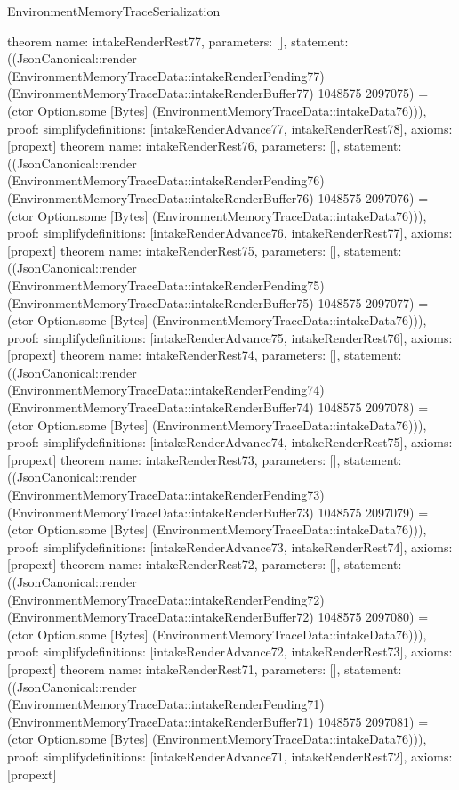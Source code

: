 \begin{lexlean}{EnvironmentMemoryTraceSerialization}
\begin{semanticmodule}
{}
theorem{
 name: intakeRenderRest77, parameters: [],
 statement: ((JsonCanonical::render (EnvironmentMemoryTraceData::intakeRenderPending77) (EnvironmentMemoryTraceData::intakeRenderBuffer77) 1048575 2097075) = (ctor Option.some [Bytes] (EnvironmentMemoryTraceData::intakeData76))), proof: simplify{definitions: [intakeRenderAdvance77, intakeRenderRest78]}, axioms: [propext]
}
theorem{
 name: intakeRenderRest76, parameters: [],
 statement: ((JsonCanonical::render (EnvironmentMemoryTraceData::intakeRenderPending76) (EnvironmentMemoryTraceData::intakeRenderBuffer76) 1048575 2097076) = (ctor Option.some [Bytes] (EnvironmentMemoryTraceData::intakeData76))), proof: simplify{definitions: [intakeRenderAdvance76, intakeRenderRest77]}, axioms: [propext]
}
theorem{
 name: intakeRenderRest75, parameters: [],
 statement: ((JsonCanonical::render (EnvironmentMemoryTraceData::intakeRenderPending75) (EnvironmentMemoryTraceData::intakeRenderBuffer75) 1048575 2097077) = (ctor Option.some [Bytes] (EnvironmentMemoryTraceData::intakeData76))), proof: simplify{definitions: [intakeRenderAdvance75, intakeRenderRest76]}, axioms: [propext]
}
theorem{
 name: intakeRenderRest74, parameters: [],
 statement: ((JsonCanonical::render (EnvironmentMemoryTraceData::intakeRenderPending74) (EnvironmentMemoryTraceData::intakeRenderBuffer74) 1048575 2097078) = (ctor Option.some [Bytes] (EnvironmentMemoryTraceData::intakeData76))), proof: simplify{definitions: [intakeRenderAdvance74, intakeRenderRest75]}, axioms: [propext]
}
theorem{
 name: intakeRenderRest73, parameters: [],
 statement: ((JsonCanonical::render (EnvironmentMemoryTraceData::intakeRenderPending73) (EnvironmentMemoryTraceData::intakeRenderBuffer73) 1048575 2097079) = (ctor Option.some [Bytes] (EnvironmentMemoryTraceData::intakeData76))), proof: simplify{definitions: [intakeRenderAdvance73, intakeRenderRest74]}, axioms: [propext]
}
theorem{
 name: intakeRenderRest72, parameters: [],
 statement: ((JsonCanonical::render (EnvironmentMemoryTraceData::intakeRenderPending72) (EnvironmentMemoryTraceData::intakeRenderBuffer72) 1048575 2097080) = (ctor Option.some [Bytes] (EnvironmentMemoryTraceData::intakeData76))), proof: simplify{definitions: [intakeRenderAdvance72, intakeRenderRest73]}, axioms: [propext]
}
theorem{
 name: intakeRenderRest71, parameters: [],
 statement: ((JsonCanonical::render (EnvironmentMemoryTraceData::intakeRenderPending71) (EnvironmentMemoryTraceData::intakeRenderBuffer71) 1048575 2097081) = (ctor Option.some [Bytes] (EnvironmentMemoryTraceData::intakeData76))), proof: simplify{definitions: [intakeRenderAdvance71, intakeRenderRest72]}, axioms: [propext]
}
\end{semanticmodule}
\end{lexlean}
